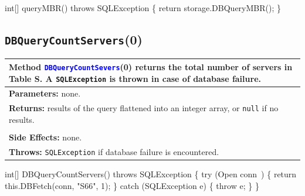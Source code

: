 \nwenddocs{}\endmoddef{}
int[] queryMBR() throws SQLException \{
  return storage.DBQueryMBR();
\}
\eatline
{}\nwendcode{}\nwdocspar
\subsection{{\tt{}\protect{}DBQueryCountServers}(0)}
\begin{tabular}{p{\textwidth}}
\toprule
\rowcolor{TableTitle}
Method \textcolor{blue}{{\tt{}DBQueryCountSevers}}(0) returns the total number
of servers in Table S.
A {\tt{}SQLException} is thrown in case of database failure.\\
\midrule
\textbf{Parameters:} none.\\
\textbf{Returns:} results of the query flattened into an integer array, or
{\tt{}null} if no results.

\begin{tikzpicture}
\small
\matrix[nodes={draw,minimum size=6mm}] {
  \node {$0:\textrm{number of servers in Table S}$};\\
};
\end{tikzpicture}\\
\textbf{Side Effects:} none.\\
\textbf{Throws:} {\tt{}SQLException} if database failure is encountered.\\
\bottomrule
\end{tabular}
\nwenddocs{}\endmoddef{}
int[] DBQueryCountServers() throws SQLException \{
  try (\LA{}Open \code{}conn\edoc{}~{\nwtagstyle{}}\RA{}) \{
    return this.DBFetch(conn, "S66", 1);
  \} catch (SQLException e) \{
    throw e;
  \}
\}
\eatline
